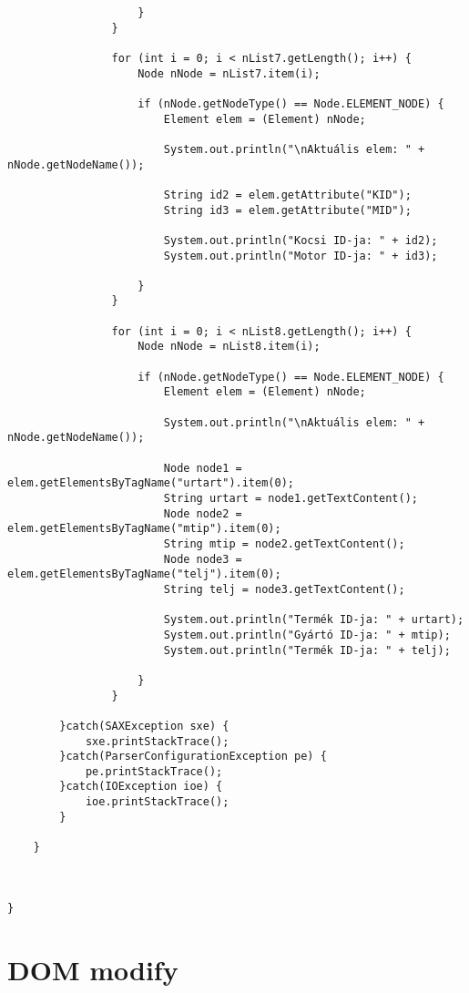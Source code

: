 \documentclass[14pt]{extarticle}
\begin{document}
\begin{normalsize}
\begin{verbatim}
		            }
		        }
		        
		        for (int i = 0; i < nList7.getLength(); i++) {
		            Node nNode = nList7.item(i);

		            if (nNode.getNodeType() == Node.ELEMENT_NODE) {
		                Element elem = (Element) nNode;

		                System.out.println("\nAktuális elem: " + nNode.getNodeName());

		                String id2 = elem.getAttribute("KID");
		                String id3 = elem.getAttribute("MID");
  
		                System.out.println("Kocsi ID-ja: " + id2);
			            System.out.println("Motor ID-ja: " + id3);

		            }
		        }
		        
		        for (int i = 0; i < nList8.getLength(); i++) {
		            Node nNode = nList8.item(i);

		            if (nNode.getNodeType() == Node.ELEMENT_NODE) {
		                Element elem = (Element) nNode;

		                System.out.println("\nAktuális elem: " + nNode.getNodeName());

		                Node node1 = elem.getElementsByTagName("urtart").item(0);
		                String urtart = node1.getTextContent();
		                Node node2 = elem.getElementsByTagName("mtip").item(0);
		                String mtip = node2.getTextContent();
		                Node node3 = elem.getElementsByTagName("telj").item(0);
		                String telj = node3.getTextContent();	

		                System.out.println("Termék ID-ja: " + urtart);
		                System.out.println("Gyártó ID-ja: " + mtip);
		                System.out.println("Termék ID-ja: " + telj);

		            }
		        }
			
		}catch(SAXException sxe) {
			sxe.printStackTrace();
		}catch(ParserConfigurationException pe) {
			pe.printStackTrace();
		}catch(IOException ioe) {
			ioe.printStackTrace();
		}

	}



}

		\end{verbatim}
		\section{DOM modify}

\end{normalsize}
\end{document}
